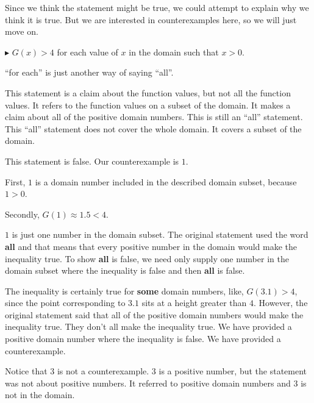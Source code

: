 \documentclass{ximera}
\begin{document}
Since we think the statement might be true, we could attempt to explain why we think it is true.  But we are interested in counterexamples here, so we will just move on.















\textbf{\textcolor{red!70!darkgray}{$\blacktriangleright$}} $G(x) > 4$ for each value of $x$ in the domain such that $x > 0$. 



``for each'' is just another way of saying ``all''.

This statement is a claim about the function values, but not all the function values.  It refers to the function values on a subset of the domain.  It makes a claim about all of the positive domain numbers. This is still an ``all'' statement.  This ``all'' statement does not cover the whole domain.  It covers a subset of the domain.



This statement is false. Our counterexample is $1$.  


First, $1$ is a domain number included in the described domain subset, because $1 > 0$. 


Secondly, $G(1) \approx 1.5 < 4$. 



$1$ is just one number in the domain subset.   The original statement used the word \textbf{all} and that means that every positive number in the domain would make the inequality true.  To show \textbf{all} is false, we need only supply one number in the domain subset where the inequality is false and then \textbf{all} is false. 

The inequality is certainly true for \textbf{some} domain numbers, like, $G(3.1) > 4$, since the point corresponding to $3.1$ sits at a height greater than $4$.  However, the original statement said that all of the positive domain numbers would make the inequality true. They don't all make the inequality true.  We have provided a positive domain number where the inequality is false. We have provided a counterexample. 

Notice that $3$ is not a counterexample.  $3$ is a positive number, but the statement was not about positive numbers.  It referred to positive domain numbers and $3$ is not in the domain.
\end{document}
